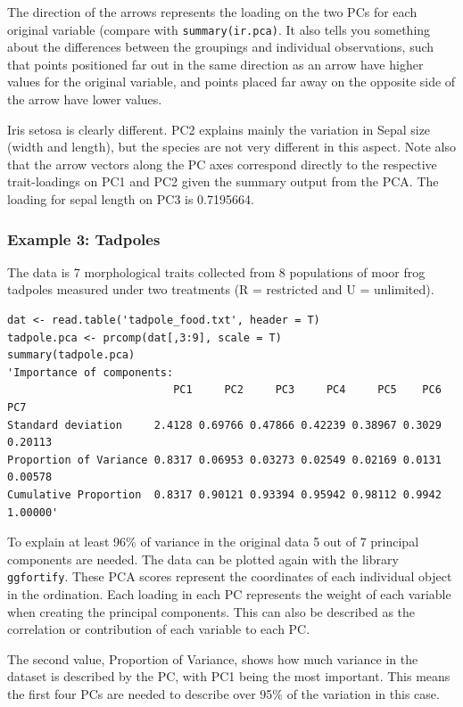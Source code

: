 \documentclass{article}
\begin{document}
The direction of the arrows represents the loading on the two PCs for each original variable (compare with \texttt{summary(ir.pca)}. It also tells you something about the differences between the groupings and individual observations, such that points positioned far out in the same direction as an arrow have higher values for the original variable, and points placed far away on the opposite side of the arrow have lower values.\par 
Iris setosa is clearly different. PC2 explains mainly the variation in Sepal size (width and length), but the species are not very different in this aspect. Note also that the arrow vectors along the PC axes correspond directly to the respective trait-loadings on PC1 and PC2 given the summary output from the PCA. The loading for sepal length on PC3 is 0.7195664.

\subsubsection{Example 3: Tadpoles}
The data is 7 morphological traits collected from 8 populations of moor frog tadpoles measured under two treatments (R = restricted and U = unlimited).

\begin{lstlisting}
dat <- read.table('tadpole_food.txt', header = T)
tadpole.pca <- prcomp(dat[,3:9], scale = T)
summary(tadpole.pca)
'Importance of components:
                          PC1     PC2     PC3     PC4     PC5    PC6     PC7
Standard deviation     2.4128 0.69766 0.47866 0.42239 0.38967 0.3029 0.20113
Proportion of Variance 0.8317 0.06953 0.03273 0.02549 0.02169 0.0131 0.00578
Cumulative Proportion  0.8317 0.90121 0.93394 0.95942 0.98112 0.9942 1.00000'
\end{lstlisting}

To explain at least 96\% of variance in the original data 5 out of 7 principal components are needed. The data can be plotted again with the library \texttt{ggfortify}. These PCA scores represent the coordinates of each individual object in the ordination. Each loading in each PC represents the weight of each variable when creating the principal components. This can also be described as the correlation or contribution of each variable to each PC.\par 
The second value, Proportion of Variance, shows how much variance in the dataset is described by the PC, with PC1 being the most important. This means the first four PCs are needed to describe over 95\% of the variation in this case.
\end{document}
